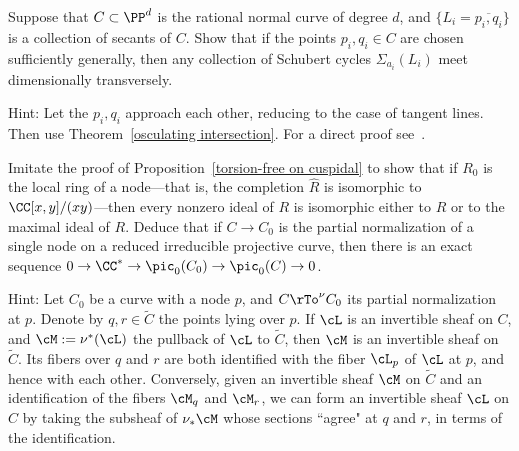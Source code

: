 \begin{exercise}\label{BN via nodal curves}\label{secant general position}
Suppose that $C\subset \PP^{d}$ is the rational normal curve of degree $d$, and $\{L_{i} = \overline{p_{i},q_{i}}\}$
is a collection of secants of $C$. Show that if the points $p_{i}, q_{i}\in C$ are chosen sufficiently generally,
then any collection of Schubert cycles $\Sigma_{a_{i}}(L_{i})$ meet dimensionally transversely.

Hint: Let the $p_{i}, q_{i}$ approach each other, reducing to the case of tangent lines. Then use
Theorem~\ref{osculating intersection}. For a direct proof see~\cite[Lemma, p. 259]{Griffiths-Harris-BN}.
\end{exercise}

\begin{exercise}\label{linear series on a nodal curve}
Imitate the proof of Proposition~\ref{torsion-free on cuspidal} to show that if $R_{0}$ is the local ring of a node---that is, the completion $\widehat R$ is isomorphic to $\CC[x,y]/(xy)$---then every nonzero ideal of $R$ is isomorphic
either to $R$ or to the maximal ideal of $R$. Deduce that if $C\to C_{0}$ is the
partial normalization of a single node on a reduced irreducible projective curve, then there is an exact sequence
$0\to \CC^{*} \to \pic_{0}(C_{0}) \to \pic_{0}(C) \to 0$.

Hint:
Let $C_{0}$ be a curve with a node $p$, and $C \rTo^\nu C_{0}$ its partial normalization at $p$. Denote by $q,r \in \widetilde C$ the points lying over $p$. If $\cL$ is an invertible sheaf on $C$, and $\cM := \nu^*(\cL)$ the pullback of $\cL$ to $\widetilde C$, then $\cM$ is an invertible sheaf on $\widetilde C$. Its fibers over $q$ and $r$ are both identified with the fiber $\cL_p$ of $\cL$ at $p$, and hence with each other. Conversely, given an invertible sheaf $\cM$ on $\widetilde C$ and an identification of the fibers $\cM_q$ and $\cM_r$, we can form an invertible sheaf $\cL$ on $C$ by taking the subsheaf of $\nu_*\cM$ whose sections ``agree" at $q$ and $r$, in terms of the identification. 
\end{exercise}
 
